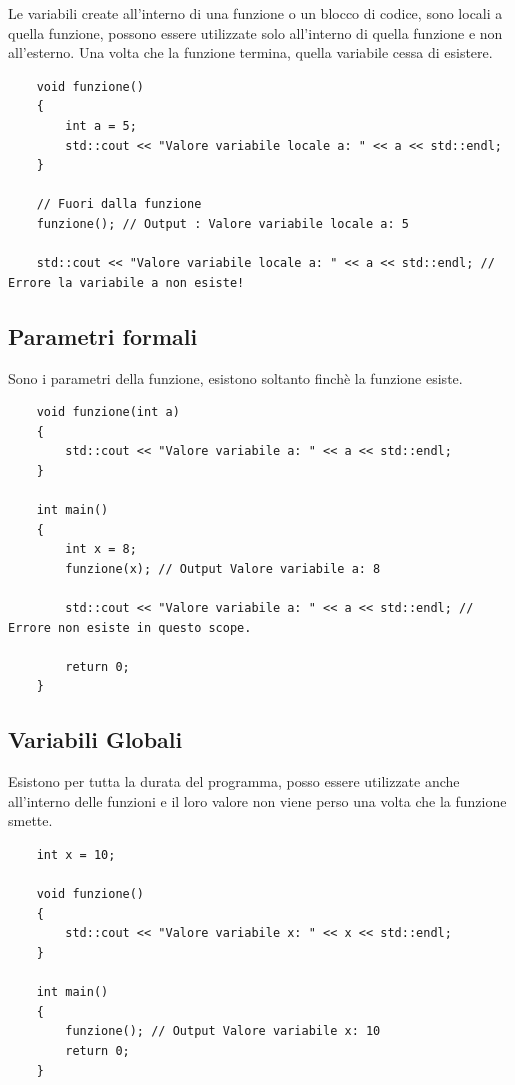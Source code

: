 \textsf{\small Le variabili create all'interno di una funzione o un blocco di codice, sono locali a quella funzione, possono essere utilizzate solo all'interno di quella funzione e non all'esterno. Una volta che la funzione termina, quella variabile cessa di esistere.} \\

\begin{lstlisting}
	void funzione()
	{
		int a = 5;
		std::cout << "Valore variabile locale a: " << a << std::endl;
	}
	
	// Fuori dalla funzione
	funzione(); // Output : Valore variabile locale a: 5
	
	std::cout << "Valore variabile locale a: " << a << std::endl; // Errore la variabile a non esiste!
\end{lstlisting}

\subsection{Parametri formali}

\textsf{\small Sono i parametri della funzione, esistono soltanto finchè la funzione esiste.} \\

\begin{lstlisting}
	void funzione(int a)
	{
		std::cout << "Valore variabile a: " << a << std::endl;
	}
	
	int main()
	{
		int x = 8;
		funzione(x); // Output Valore variabile a: 8
		
		std::cout << "Valore variabile a: " << a << std::endl; // Errore non esiste in questo scope.
		
		return 0;
	}
\end{lstlisting}

\subsection{Variabili Globali}

\textsf{\small Esistono per tutta la durata del programma, posso essere utilizzate anche all'interno delle funzioni e il loro valore non viene perso una volta che la funzione smette.} \\

\begin{lstlisting}
	int x = 10;
	
	void funzione()
	{
		std::cout << "Valore variabile x: " << x << std::endl;
	}
	
	int main()
	{
		funzione(); // Output Valore variabile x: 10
		return 0;
	}
\end{lstlisting}

